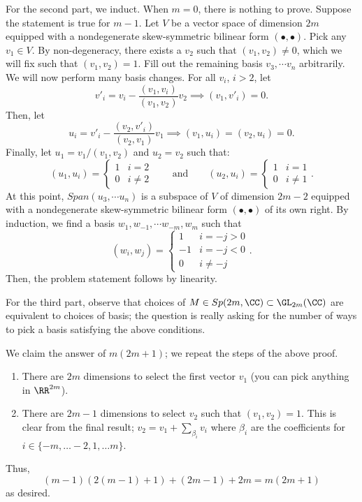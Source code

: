 \documentclass[11pt, headheight=30pt]{scrartcl}
\begin{document}
For the second part, we induct. When $m = 0$, there is nothing to prove.
Suppose the statement is true for $m-1$. Let $V$ be a vector space of dimension
$2m$ equipped with a nondegenerate skew-symmetric bilinear form $(\bullet,\bullet)$.
Pick any $v_1\in V$. By non-degeneracy, there exists a $v_2$ such that
$(v_1, v_2) \neq 0$, which we will fix such that $(v_1, v_2) = 1$.
Fill out the remaining basis $v_3,\cdots v_n$ arbitrarily.
We will now perform many basis changes. For all $v_i$, $i > 2$, let
\[
    v'_i = v_i - \frac{(v_1, v_i)}{(v_1, v_2)}v_2 \implies (v_1, v'_i) = 0.    
\]
Then, let
\[
    u_i = v'_i - \frac{(v_2, v'_i)}{(v_2, v_1)}v_1 \implies (v_1, u_i) = (v_2, u_i) = 0.
\]
Finally, let $u_1 = v_1 / (v_1, v_2)$ and $u_2 = v_2$ such that:
\[
    (u_1, u_i) = \begin{cases}
        1 & i = 2 \\
        0 & i \neq 2
    \end{cases}\qquad\text{and}\qquad
    (u_2, u_i) = \begin{cases}
        1 & i = 1 \\
        0 & i \neq 1
    \end{cases}.
\]
At this point, $Span(u_3,\cdots u_n)$ is a subspace of $V$ of dimension $2m - 2$
equipped with a nondegenerate skew-symmetric bilinear form $(\bullet,\bullet)$ of its
own right. By induction, we find a basis $w_1, w_{-1}, \cdots w_{-m}, w_m$ such that
\[
    (w_i, w_j) = \begin{cases}
        1 & i = -j > 0 \\
        -1 & i = -j < 0 \\
        0 & i \neq -j
    \end{cases}.
\]
Then, the problem statement follows by linearity.

For the third part, observe that choices of $M\in Sp(2m, \CC)\subset \GL_{2m}(\CC)$
are equivalent to choices of basis; the question is really asking for
the number of ways to pick a basis satisfying the above conditions.

We claim the answer of $m(2m + 1)$; we repeat the steps of the above proof.
\begin{enumerate}
    \item There are $2m$ dimensions to select the first vector
    $v_1$ (you can pick anything in $\RR^{2m}$).
    \item There are $2m - 1$ dimensions to select $v_2$ such
    that $(v_1, v_2) = 1$. This is clear from the final result;
    $v_2 = v_1 + \sum_{\beta_i} v_i$ where $\beta_i$ are the coefficients
    for $i\in \{-m,\dots -2, 1, \dots m\}$.
\end{enumerate}
Thus,
\[
    (m-1)(2(m-1) + 1) + (2m-1) + 2m = m(2m + 1)    
\]
as desired.
\end{document}
